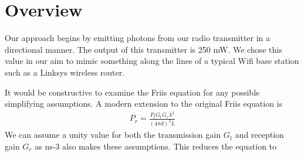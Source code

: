 \documentclass[%
        final,
        notitlepage,
        narroweqnarray,
        inline,
        twoside,
        ]{ieee}
\begin{document}




\section{Overview}
Our approach begins by emitting photons from our radio transmitter in a
directional manner.  The output of this transmitter is 250 mW.  We chose this
value in our aim to mimic something along the lines of a typical Wifi base
station such as a Linksys wireless router.

It would be constructive to examine the Friis equation for any possible
simplifying assumptions.  A modern extension to the original Friis equation
\cite{1697062} is
\begin{eqnarray}
P_r = \frac{P_t G_t G_r \lambda^2}{(4 \pi d)^2 L}
\end{eqnarray}
We can assume a unity value for both the transmission gain $G_t$ and reception
gain $G_r$ as ns-3 also makes these assumptions.  This reduces the equation to
\end{document}
